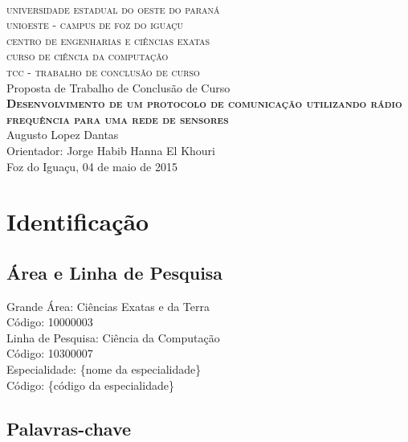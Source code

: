 \documentclass[
    12pt,               %
    a4paper,            %
    english,            %
    brazil,             %
    ]{article}
\begin{document}
\begin{center}

    \textsc{
        \large
            \\universidade estadual do oeste do paraná
            \\unioeste - campus de foz do iguaçu
            \\centro de engenharias e ciências exatas
            \\curso de ciência da computação
            \\[1 cm]tcc - trabalho de conclusão de curso
    }
    \\
    [4 cm]
    \large Proposta de Trabalho de Conclusão de Curso
    \\
    \textbf{
        \textsc{Desenvolvimento de um protocolo de comunicação utilizando rádio frequência para uma rede de sensores}
    }
    \\[5 cm]Augusto Lopez Dantas
    \\Orientador: Jorge Habib Hanna El Khouri
    \\[2 cm]Foz do Iguaçu, 04 de maio de 2015

\end{center}

\thispagestyle{empty}

\section{Identificação}

    \subsection{Área e Linha de Pesquisa}
        \noindent Grande Área: Ciências Exatas e da Terra
        \\Código: 10000003
        \\[1 cm]Linha de Pesquisa: Ciência da Computação
        \\Código: 10300007
        \\[1 cm]Especialidade: \{nome da especialidade\}
        \\Código: \{código da especialidade\}

    \subsection{Palavras-chave}
\end{document}

